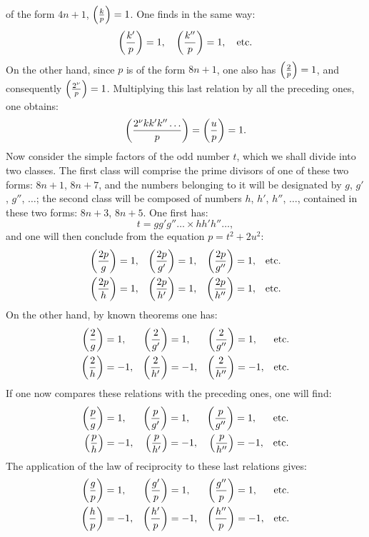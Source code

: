 \noindent
of the form $4n+1$, $\left(\frac{k}{p}\right)=1$. One finds in the same way:
\[
\left(\frac{k'}{p}\right)=1,\quad \left(\frac{k''}{p}\right)=1,\quad\text{etc.}
\]
On the other hand, since $p$ is of the form $8n+1$, one also has $\left(\frac{2}{p}\right)=1$,
and consequently $\left(\frac{2^\nu}{p}\right)=1$. Multiplying this last relation by all the
preceding ones, one obtains:
\[
\left(\frac{2^\nu kk'k''\ldots}{p}\right)=\left(\frac{u}{p}\right)=1.
\]
Now consider the simple factors of the odd number $t$, which we shall divide
into two classes. The first class will comprise the prime divisors of one of
these two forms: $8n+1$, $8n+7$, and the numbers belonging to it will be designated
by $g$, $g'$, $g''$, $\ldots$; the second class will be composed of numbers
$h$, $h'$, $h''$, $\ldots$, contained in these two forms: $8n+3$, $8n+5$.
One first has:
\[
t=gg'g''\ldots\times hh'h''\ldots,
\]
and one will then conclude from the equation $p=t^2+2u^2$:
\[
\begin{aligned}
\left(\frac{2p}{g}\right)&=1, &\left(\frac{2p}{g'}\right)&=1, &\left(\frac{2p}{g''}\right)&=1, &\text{etc.}\\
\left(\frac{2p}{h}\right)&=1, &\left(\frac{2p}{h'}\right)&=1, &\left(\frac{2p}{h''}\right)&=1, &\text{etc.}
\end{aligned}
\]
On the other hand, by known theorems one has:
\[
\begin{aligned}
\left(\frac{2}{g}\right)&=1, &\left(\frac{2}{g'}\right)&=1, &\left(\frac{2}{g''}\right)&=1, &\text{etc.}\\
\left(\frac{2}{h}\right)&=-1, &\left(\frac{2}{h'}\right)&=-1, &\left(\frac{2}{h''}\right)&=-1, &\text{etc.}
\end{aligned}
\]
If one now compares these relations with the preceding ones, one will find:
\[
\begin{aligned}
\left(\frac{p}{g}\right)&=1, &\left(\frac{p}{g'}\right)&=1, &\left(\frac{p}{g''}\right)&=1, &\text{etc.}\\
\left(\frac{p}{h}\right)&=-1, &\left(\frac{p}{h'}\right)&=-1, &\left(\frac{p}{h''}\right)&=-1, &\text{etc.}
\end{aligned}
\]
The application of the law of reciprocity to these last relations gives:
\[
\begin{aligned}
\left(\frac{g}{p}\right)&=1, &\left(\frac{g'}{p}\right)&=1, &\left(\frac{g''}{p}\right)&=1, &\text{etc.}\\
\left(\frac{h}{p}\right)&=-1, &\left(\frac{h'}{p}\right)&=-1, &\left(\frac{h''}{p}\right)&=-1, &\text{etc.}
\end{aligned}
\]
